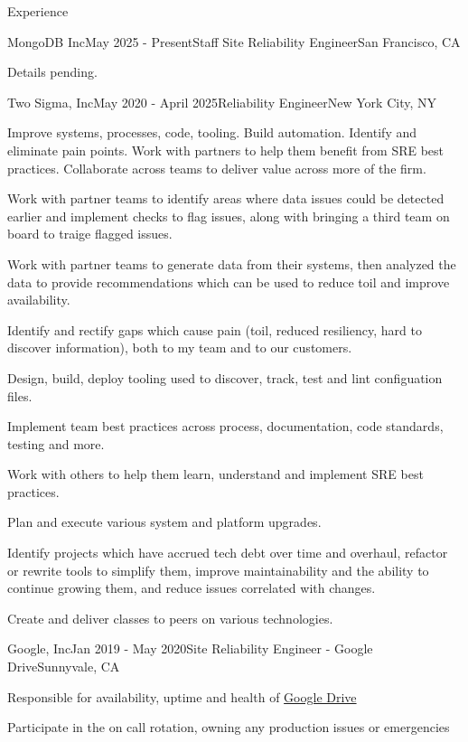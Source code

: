 \documentclass{resume}
\begin{document}
  \begin{rSection}{Experience}
    \begin{rSubsection}{MongoDB Inc}{May 2025 - Present}{Staff Site Reliability Engineer}{San Francisco, CA}
      \item Details pending.
    \end{rSubsection}

    \begin{rSubsection}{Two Sigma, Inc}{May 2020 - April 2025}{Reliability Engineer}{New York City, NY}
      \item Improve systems, processes, code, tooling. Build automation. Identify and eliminate pain points. Work with partners to help them benefit from SRE best practices. Collaborate across teams to deliver value across more of the firm.
      \item Work with partner teams to identify areas where data issues could be detected earlier and implement checks to flag issues, along with bringing a third team on board to traige flagged issues.
      \item Work with partner teams to generate data from their systems, then analyzed the data to provide recommendations which can be used to reduce toil and improve availability.
      \item Identify and rectify gaps which cause pain (toil, reduced resiliency, hard to discover information), both to my team and to our customers.
      \item Design, build, deploy tooling used to discover, track, test and lint configuation files.
      \item Implement team best practices across process, documentation, code standards, testing and more.
      \item Work with others to help them learn, understand and implement SRE best practices.
      \item Plan and execute various system and platform upgrades.
      \item Identify projects which have accrued tech debt over time and overhaul, refactor or rewrite tools to simplify them, improve maintainability and the ability to continue growing them, and reduce issues correlated with changes.
      \item Create and deliver classes to peers on various technologies.
    \end{rSubsection}

    \begin{rSubsection}{Google, Inc}{Jan 2019 - May 2020}{Site Reliability Engineer - Google Drive}{Sunnyvale, CA}
      \item Responsible for availability, uptime and health of \href{https://drive.google.com}{Google Drive}
      \item Participate in the on call rotation, owning any production issues or emergencies
    \end{rSubsection}


\end{rSection}
\end{document}
